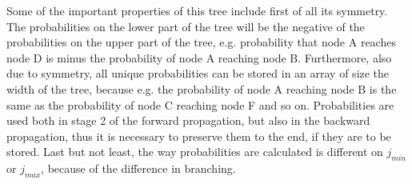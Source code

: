 Some of the important properties of this tree include first of all its symmetry. The probabilities on the lower part of the tree will be the negative of the probabilities on the upper part of the tree, e.g. probability that node A reaches node D is minus the probability of node A reaching node B. Furthermore, also due to symmetry, all unique probabilities can be stored in an array of size the width of the tree, because e.g. the probability of node A reaching node B is the same as the probability of node C reaching node F and so on. Probabilities are used both in stage 2 of the forward propagation, but also in the backward propagation, thus it is necessary to preserve them to the end, if they are to be stored. Last but not least, the way probabilities are calculated is different on $j_{min}$ or $j_{max}$, because of the difference in branching. 

